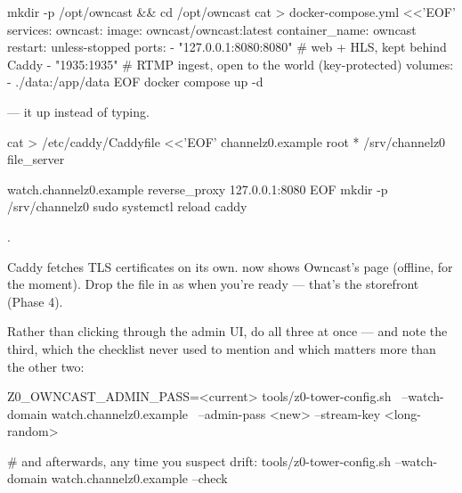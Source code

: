 \documentclass[fontpath=fonts/,logopath=logo/]{riposte-doc}
\begin{document}

\ripcodeopen
{}
\begin{ripcodeblock}
mkdir -p /opt/owncast && cd /opt/owncast
cat > docker-compose.yml <<'EOF'
services:
  owncast:
    image: owncast/owncast:latest
    container_name: owncast
    restart: unless-stopped
    ports:
      - "127.0.0.1:8080:8080"   # web + HLS, kept behind Caddy
      - "1935:1935"             # RTMP ingest, open to the world (key-protected)
    volumes:
      - ./data:/app/data
EOF
docker compose up -d
\end{ripcodeblock}
\ripcodesizereset\ripcodeclose

\ripmarker{}   —  it up instead of typing.



\ripcodeopen
{}
\begin{ripcodeblock}
cat > /etc/caddy/Caddyfile <<'EOF'
channelz0.example {
    root * /srv/channelz0
    file_server
}

watch.channelz0.example {
    reverse_proxy 127.0.0.1:8080
}
EOF
mkdir -p /srv/channelz0
sudo systemctl reload caddy
\end{ripcodeblock}
\ripcodesizereset\ripcodeclose

\ripmarker{}  .

Caddy fetches TLS certificates on its own.  now shows Owncast's page (offline, for the moment). Drop the  file in as  when you're ready — that's the storefront (Phase 4).



Rather than clicking through the admin UI, do all three at once — and note the third, which the checklist never used to mention and which matters more than the other two:

\ripcodeopen
{}
\begin{ripcodeblock}
Z0_OWNCAST_ADMIN_PASS=<current> tools/z0-tower-config.sh \
  --watch-domain watch.channelz0.example \
  --admin-pass <new> --stream-key <long-random>

# and afterwards, any time you suspect drift:
tools/z0-tower-config.sh --watch-domain watch.channelz0.example --check
\end{ripcodeblock}
\ripcodesizereset\ripcodeclose
\end{document}
